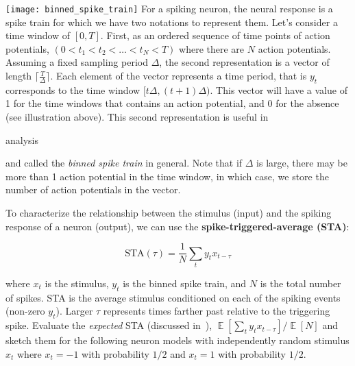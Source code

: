 \documentclass[a4paper,11pt]{exam}
\newif\ifMATLAB %
\DeclareMathOperator*{\E}{\mathbb{E}} %
\newcommand{\funfact}{\textbf{Fun Fact:}~}
\begin{document}
\begin{questions}

\newpage

\texttt{[image: binned\_spike\_train]}
For a spiking neuron, the neural response is a spike train for which we have two notations to represent them.
Let's consider a time window of $[0, T]$.
First, as an ordered sequence of time points of action potentials, $(0 < t_1 < t_2 < \ldots < t_N < T)$ where there are $N$ action potentials.
Assuming a fixed sampling period $\Delta$, the second representation is a vector of length $\lceil\frac{T}{\Delta}\rceil$.
Each element of the vector represents a time period, that is $y_t$ corresponds to the time window $[t\Delta, (t+1)\Delta)$.
This vector will have a value of 1 for the time windows that contains an action potential, and 0 for the absence (see illustration above).
This second representation is useful in 
\ifMATLAB
MATLAB
\else
analysis
\fi
 and called the \emph{binned spike train} in general.
Note that if $\Delta$ is large, there may be more than 1 action potential in the time window, in which case, we store the number of action potentials in the vector.

\question To characterize the relationship between the stimulus (input) and the spiking response of a neuron (output), we can use the \textbf{spike-triggered-average (STA)}:
\begin{tcolorbox}[colback=red!5!white,colframe=red!50!black]
\noindent
\begin{equation}\label{eq:sta}
    \text{STA}(\tau) = \frac{1}{N} \sum_t y_{t} x_{t-\tau}
\end{equation}
\end{tcolorbox}
where $x_t$ is the stimulus, $y_t$ is the binned spike train, and $N$ is the total number of spikes.
STA is the average stimulus conditioned on each of the spiking events (non-zero $y_t$).
Larger $\tau$ represents times farther past relative to the triggering spike.
Evaluate the \emph{expected} STA (discussed in~\citet{Dayan2001}), $\E[\sum_t y_{t} x_{t-\tau}]/\E[N]$ and sketch them for the following neuron models with independently random stimulus $x_t$ where $x_t = -1$ with probability $1/2$ and $x_t = 1$ with probability $1/2$.
\begin{parts}

\end{parts}
\end{questions}
\end{document}
